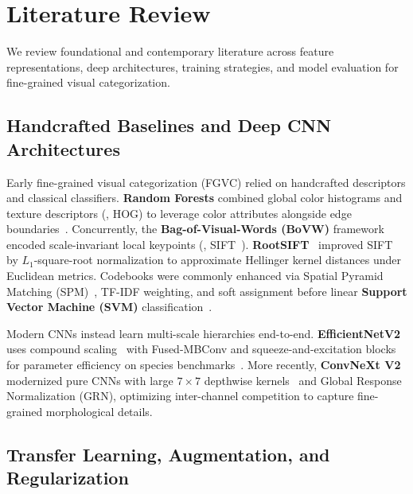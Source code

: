 \section{Literature Review}
\label{sec:litreview}

We review foundational and contemporary literature across feature representations, deep architectures, training strategies, and model evaluation for fine-grained visual categorization.

\subsection{Handcrafted Baselines and Deep CNN Architectures}
\label{sec:litreview-architectures}
\label{sec:litreview-rf}
\label{sec:litreview-svm}
\label{sec:litreview-efficientnetv2}
\label{sec:litreview-convnextv2}

Early fine-grained visual categorization (FGVC) relied on handcrafted descriptors and classical classifiers. \textbf{Random Forests} combined global color histograms and texture descriptors (\eg, HOG) to leverage color attributes alongside edge boundaries~\cite{singh2018improved,HALLUR2025100366,sen2026featureengineering}. Concurrently, the \textbf{Bag-of-Visual-Words (BoVW)} framework encoded scale-invariant local keypoints (\eg, SIFT~\cite{lowe2004distinctive}). \textbf{RootSIFT}~\cite{arandjelovic2012three} improved SIFT by $L_1$-square-root normalization to approximate Hellinger kernel distances under Euclidean metrics. Codebooks were commonly enhanced via Spatial Pyramid Matching (SPM)~\cite{lazebnik2006beyond}, TF-IDF weighting, and soft assignment before linear \textbf{Support Vector Machine (SVM)} classification~\cite{csurka2004visual,cortes1995support}.

Modern CNNs instead learn multi-scale hierarchies end-to-end. \textbf{EfficientNetV2}~\cite{tan2021efficientnetv2} uses compound scaling~\cite{tan2019efficientnet} with Fused-MBConv and squeeze-and-excitation blocks for parameter efficiency on species benchmarks~\cite{bloch2022snakeclef}. More recently, \textbf{ConvNeXt V2}~\cite{woo2023convnextv2} modernized pure CNNs with large $7 \times 7$ depthwise kernels~\cite{liu2022convnext} and Global Response Normalization (GRN), optimizing inter-channel competition to capture fine-grained morphological details.

\subsection{Transfer Learning, Augmentation, and Regularization}
\label{sec:litreview-training-strategies}
\label{sec:litreview-transfer}

